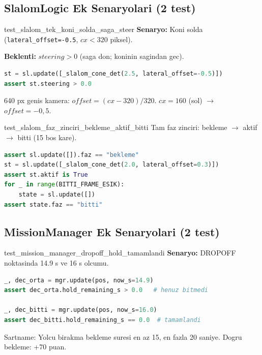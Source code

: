 \documentclass[a4paper,12pt]{article}
\begin{document}
\subsection{SlalomLogic Ek Senaryolari (2 test)}

\begin{testbox}{test\_slalom\_tek\_koni\_solda\_saga\_steer}
\textbf{Senaryo:} Koni solda (\texttt{lateral\_offset=-0.5},
$cx < 320$ piksel).

\textbf{Beklenti:} $steering > 0$ (saga don; koninin sagindan gec).

\begin{lstlisting}[language=Python]
st = sl.update([_slalom_cone_det(2.5, lateral_offset=-0.5)])
assert st.steering > 0.0
\end{lstlisting}

\begin{specbox}
640 px genis kamera: $offset = (cx - 320) / 320$.
$cx=160$ (sol) $\to$ $offset=-0{,}5$.
\end{specbox}
\end{testbox}

\begin{testbox}{test\_slalom\_faz\_zinciri\_bekleme\_aktif\_bitti}
Tam faz zinciri: bekleme $\to$ aktif $\to$ bitti (15 bos kare).

\begin{lstlisting}[language=Python]
assert sl.update([]).faz == "bekleme"
st = sl.update([_slalom_cone_det(2.0, lateral_offset=0.3)])
assert st.aktif is True
for _ in range(BITTI_FRAME_ESIK):
    state = sl.update([])
assert state.faz == "bitti"
\end{lstlisting}
\end{testbox}

\subsection{MissionManager Ek Senaryolari (2 test)}

\begin{testbox}{test\_mission\_manager\_dropoff\_hold\_tamamlandi}
\textbf{Senaryo:} DROPOFF noktasinda 14.9 s ve 16 s olcumu.

\begin{lstlisting}[language=Python]
_, dec_orta = mgr.update(pos, now_s=14.9)
assert dec_orta.hold_remaining_s > 0.0   # henuz bitmedi

_, dec_bitti = mgr.update(pos, now_s=16.0)
assert dec_bitti.hold_remaining_s == 0.0  # tamamlandi
\end{lstlisting}

\begin{specbox}
Sartname: Yolcu birakma bekleme suresi en az 15, en fazla 20 saniye.
Dogru bekleme: +70 puan.
\end{specbox}
\end{testbox}
\end{document}
